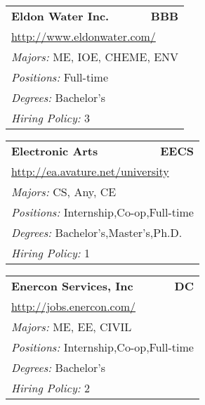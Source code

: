 \documentclass[twoside]{article}
\begin{document}
\begin{center}
\begin{multicols}{3}
\begin{FlushLeft}
\begin{minipage}{.9\columnwidth}
\end{minipage}
 
\begin{minipage}{.9\columnwidth}\begin{tabularx}{.95\columnwidth}{Xr}
                 {\Large\bf Eldon Water Inc.} & {\Large\bf BBB}\\
    \multicolumn{2}{p{.95\columnwidth}}{\url{http://www.eldonwater.com/}}\\
    \multicolumn{2}{p{.95\columnwidth}}{\emph{Majors:} ME, IOE, CHEME, ENV}\\
    \multicolumn{2}{p{.95\columnwidth}}{\emph{Positions:} Full-time}\\
    \multicolumn{2}{p{.95\columnwidth}}{\emph{Degrees:} Bachelor's}\\
    \multicolumn{2}{p{.95\columnwidth}}{\emph{Hiring Policy:} 3}\\
    \end{tabularx}
    
\end{minipage}
 
\begin{minipage}{.9\columnwidth}\begin{tabularx}{.95\columnwidth}{Xr}
                 {\Large\bf Electronic Arts} & {\Large\bf EECS}\\
    \multicolumn{2}{p{.95\columnwidth}}{\url{http://ea.avature.net/university}}\\
    \multicolumn{2}{p{.95\columnwidth}}{\emph{Majors:} CS, Any, CE}\\
    \multicolumn{2}{p{.95\columnwidth}}{\emph{Positions:} Internship,Co-op,Full-time}\\
    \multicolumn{2}{p{.95\columnwidth}}{\emph{Degrees:} Bachelor's,Master's,Ph.D.}\\
    \multicolumn{2}{p{.95\columnwidth}}{\emph{Hiring Policy:} 1}\\
    \end{tabularx}
    
\end{minipage}
 
\begin{minipage}{.9\columnwidth}\begin{tabularx}{.95\columnwidth}{Xr}
                 {\Large\bf Enercon Services, Inc} & {\Large\bf DC}\\
    \multicolumn{2}{p{.95\columnwidth}}{\url{http://jobs.enercon.com/}}\\
    \multicolumn{2}{p{.95\columnwidth}}{\emph{Majors:} ME, EE, CIVIL}\\
    \multicolumn{2}{p{.95\columnwidth}}{\emph{Positions:} Internship,Co-op,Full-time}\\
    \multicolumn{2}{p{.95\columnwidth}}{\emph{Degrees:} Bachelor's}\\
    \multicolumn{2}{p{.95\columnwidth}}{\emph{Hiring Policy:} 2}\\
    \end{tabularx}
    

\end{minipage}
\end{FlushLeft}
\end{multicols}
\end{center}
\end{document}
